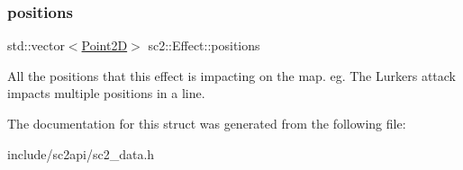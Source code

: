 \subsubsection{\texorpdfstring{positions}{positions}}
{\footnotesize\ttfamily std\+::vector$<$\hyperlink{structsc2_1_1_point2_d}{Point2D}$>$ sc2\+::\+Effect\+::positions}

All the positions that this effect is impacting on the map. eg. The Lurker\textquotesingle{}s attack impacts multiple positions in a line. 

The documentation for this struct was generated from the following file\+:\begin{DoxyCompactItemize}
\item 
include/sc2api/sc2\+\_\+data.\+h\end{DoxyCompactItemize}
